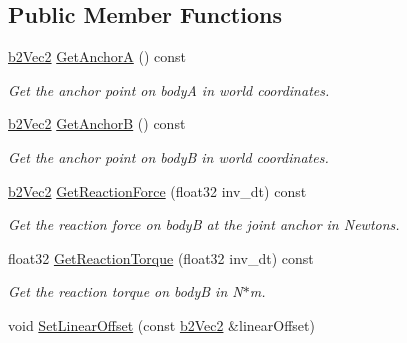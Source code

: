\subsection*{Public Member Functions}
\begin{DoxyCompactItemize}
\item 
\hyperlink{structb2_vec2}{b2\+Vec2} \hyperlink{classb2_motor_joint_ac94ea6c5f903c8d8e22724889bff2562}{Get\+AnchorA} () const \hypertarget{classb2_motor_joint_ac94ea6c5f903c8d8e22724889bff2562}{}\label{classb2_motor_joint_ac94ea6c5f903c8d8e22724889bff2562}

\begin{DoxyCompactList}\small\item\em Get the anchor point on bodyA in world coordinates. \end{DoxyCompactList}\item 
\hyperlink{structb2_vec2}{b2\+Vec2} \hyperlink{classb2_motor_joint_acb603ebe6615308654574356e8bb7dc5}{Get\+AnchorB} () const \hypertarget{classb2_motor_joint_acb603ebe6615308654574356e8bb7dc5}{}\label{classb2_motor_joint_acb603ebe6615308654574356e8bb7dc5}

\begin{DoxyCompactList}\small\item\em Get the anchor point on bodyB in world coordinates. \end{DoxyCompactList}\item 
\hyperlink{structb2_vec2}{b2\+Vec2} \hyperlink{classb2_motor_joint_ab9d427f4fd74d0afbd17989701d20924}{Get\+Reaction\+Force} (float32 inv\+\_\+dt) const \hypertarget{classb2_motor_joint_ab9d427f4fd74d0afbd17989701d20924}{}\label{classb2_motor_joint_ab9d427f4fd74d0afbd17989701d20924}

\begin{DoxyCompactList}\small\item\em Get the reaction force on bodyB at the joint anchor in Newtons. \end{DoxyCompactList}\item 
float32 \hyperlink{classb2_motor_joint_a17741b102f8bb3e32f1c139781b41c04}{Get\+Reaction\+Torque} (float32 inv\+\_\+dt) const \hypertarget{classb2_motor_joint_a17741b102f8bb3e32f1c139781b41c04}{}\label{classb2_motor_joint_a17741b102f8bb3e32f1c139781b41c04}

\begin{DoxyCompactList}\small\item\em Get the reaction torque on bodyB in N$\ast$m. \end{DoxyCompactList}\item 
void \hyperlink{classb2_motor_joint_a99254b5fc9ed9f2d0fdccada513000c3}{Set\+Linear\+Offset} (const \hyperlink{structb2_vec2}{b2\+Vec2} \&linear\+Offset)\hypertarget{classb2_motor_joint_a99254b5fc9ed9f2d0fdccada513000c3}{}\label{classb2_motor_joint_a99254b5fc9ed9f2d0fdccada513000c3}


\end{DoxyCompactItemize}
